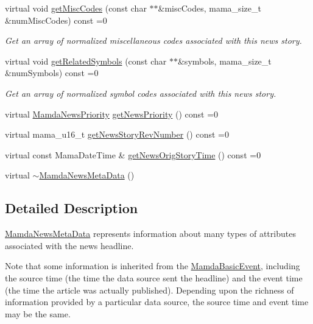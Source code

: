 \begin{CompactItemize}
virtual void \hyperlink{classWombat_1_1MamdaNewsMetaData_548e87226465849d482b2644c103c67e}{get\-Misc\-Codes} (const char $\ast$$\ast$\&misc\-Codes, mama\_\-size\_\-t \&num\-Misc\-Codes) const =0
\begin{CompactList}\small\item\em Get an array of normalized miscellaneous codes associated with this news story. \item\end{CompactList}\item 
virtual void \hyperlink{classWombat_1_1MamdaNewsMetaData_8ed97f443c8892110d53d7c2a42b8fbf}{get\-Related\-Symbols} (const char $\ast$$\ast$\&symbols, mama\_\-size\_\-t \&num\-Symbols) const =0
\begin{CompactList}\small\item\em Get an array of normalized symbol codes associated with this news story. \item\end{CompactList}\item 
virtual \hyperlink{namespaceWombat_faa7709d230f261c8aeb71420f6dd012}{Mamda\-News\-Priority} \hyperlink{classWombat_1_1MamdaNewsMetaData_1d004d2cccd57b8cdb88bc0bae62d685}{get\-News\-Priority} () const =0
\item 
virtual mama\_\-u16\_\-t \hyperlink{classWombat_1_1MamdaNewsMetaData_58b2e7b0cdd5e496b54df349b3b65676}{get\-News\-Story\-Rev\-Number} () const =0
\item 
virtual const Mama\-Date\-Time \& \hyperlink{classWombat_1_1MamdaNewsMetaData_2102fe268a03b09d9e899e9f7935949c}{get\-News\-Orig\-Story\-Time} () const =0
\item 
virtual \hyperlink{classWombat_1_1MamdaNewsMetaData_3435e4bd338604cebfb3f5c6a34ad090}{$\sim$Mamda\-News\-Meta\-Data} ()
\end{CompactItemize}


\subsection{Detailed Description}
\hyperlink{classWombat_1_1MamdaNewsMetaData}{Mamda\-News\-Meta\-Data} represents information about many types of attributes associated with the news headline. 

Note that some information is inherited from the \hyperlink{classWombat_1_1MamdaBasicEvent}{Mamda\-Basic\-Event}, including the source time (the time the data source sent the headline) and the event time (the time the article was actually published). Depending upon the richness of information provided by a particular data source, the source time and event time may be the same. 



